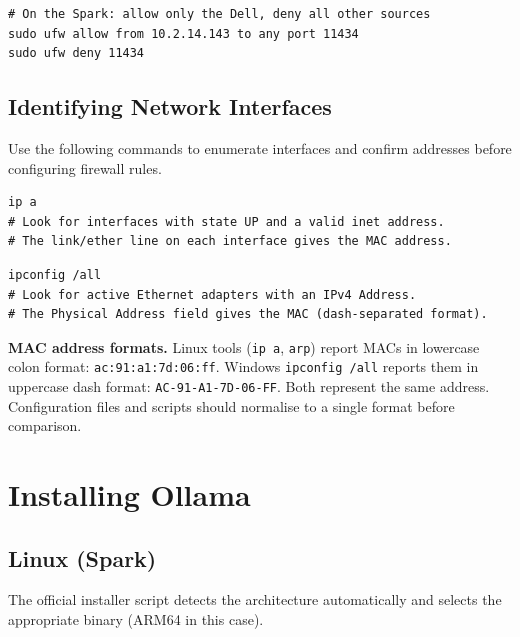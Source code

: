 \begin{lstlisting}[style=bashstyle, caption={Restrict Ollama to the Dell's IP only}]
# On the Spark: allow only the Dell, deny all other sources
sudo ufw allow from 10.2.14.143 to any port 11434
sudo ufw deny 11434
\end{lstlisting}

\subsection{Identifying Network Interfaces}

Use the following commands to enumerate interfaces and confirm addresses
before configuring firewall rules.

\begin{lstlisting}[style=bashstyle, caption={Linux: list interfaces and addresses}]
ip a
# Look for interfaces with state UP and a valid inet address.
# The link/ether line on each interface gives the MAC address.
\end{lstlisting}

\begin{lstlisting}[style=psstyle, caption={Windows: list interfaces and addresses}]
ipconfig /all
# Look for active Ethernet adapters with an IPv4 Address.
# The Physical Address field gives the MAC (dash-separated format).
\end{lstlisting}

\begin{infobox}
\textbf{MAC address formats.} Linux tools (\texttt{ip~a},
\texttt{arp}) report MACs in lowercase colon format:
\texttt{ac:91:a1:7d:06:ff}. Windows \texttt{ipconfig~{/}all} reports
them in uppercase dash format: \texttt{AC-91-A1-7D-06-FF}. Both
represent the same address. Configuration files and scripts should
normalise to a single format before comparison.
\end{infobox}

\section{Installing Ollama}
\label{sec:install}

\subsection{Linux (Spark)}

The official installer script detects the architecture automatically and
selects the appropriate binary (ARM64 in this case).

